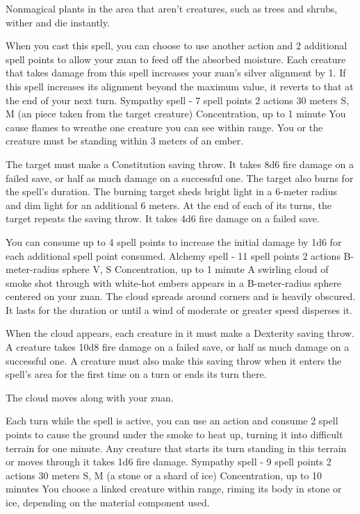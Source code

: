     Nonmagical plants in the area that aren't creatures, such as trees and shrubs, wither and die instantly.

    When you cast this spell, you can choose to use another action and 2 additional spell points to allow your zuan to feed off the absorbed moisture.
    Each creature that takes damage from this spell increases your zuan's silver alignment by 1.
    If this spell increases its alignment beyond the maximum value, it reverts to that at the end of your next turn.
    {Sympathy spell - 7 spell points}
    {2 actions}
    {30 meters}
    {S, M (an piece taken from the target creature)}
    {Concentration, up to 1 minute}
    You cause flames to wreathe one creature you can see within range.
    You or the creature must be standing within 3 meters of an ember.

    The target must make a Constitution saving throw.
    It takes 8d6 fire damage on a failed save, or half as much damage on a successful one.
    The target also burns for the spell's duration.
    The burning target sheds bright light in a 6-meter radius and dim light for an additional 6 meters.
    At the end of each of its turns, the target repeats the saving throw.
    It takes 4d6 fire damage on a failed save.

    You can consume up to 4 spell points to increase the initial damage by 1d6 for each additional spell point consumed.
    {Alchemy spell - 11 spell points}
    {2 actions}
    {B-meter-radius sphere}
    {V, S}
    {Concentration, up to 1 minute}
    A swirling cloud of smoke shot through with white-hot embers appears in a B-meter-radius sphere centered on your zuan.
    The cloud spreads around corners and is heavily obscured.
    It lasts for the duration or until a wind of moderate or greater speed disperses it.

    When the cloud appears, each creature in it must make a Dexterity saving throw.
    A creature takes 10d8 fire damage on a failed save, or half as much damage on a successful one.
    A creature must also make this saving throw when it enters the spell's area for the first time on a turn or ends its turn there.

    The cloud moves along with your zuan.

    Each turn while the spell is active, you can use an action and consume 2 spell points to cause the ground under the smoke to heat up, turning it into difficult terrain for one minute.
    Any creature that starts its turn standing in this terrain or moves through it takes 1d6 fire damage.
    {Sympathy spell - 9 spell points}
    {2 actions}
    {30 meters}
    {S, M (a stone or a shard of ice)}
    {Concentration, up to 10 minutes}
    You choose a linked creature within range, riming its body in stone or ice, depending on the material component used.

